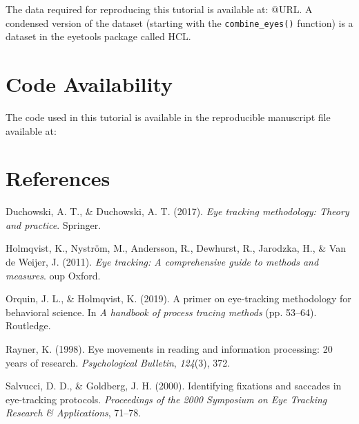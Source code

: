 \documentclass[
  man,
  floatsintext,
  longtable,
  nolmodern,
  notxfonts,
  notimes,
  colorlinks=true,linkcolor=blue,citecolor=blue,urlcolor=blue]{apa7}
\newlength{\cslhangindent}
\newenvironment{CSLReferences}[2] %
 {\begin{list}{}{%
  \setlength{\itemindent}{0pt}
  \setlength{\leftmargin}{0pt}
  \setlength{\parsep}{0pt}
  \ifodd #1
   \setlength{\leftmargin}{\cslhangindent}
   \setlength{\itemindent}{-1\cslhangindent}
  \fi
  \setlength{\itemsep}{#2\baselineskip}}}
 {\end{list}}
\begin{document}
The data required for reproducing this tutorial is available at: @URL. A
condensed version of the dataset (starting with the
\texttt{combine\_eyes()} function) is a dataset in the eyetools package
called HCL.

\section{Code Availability}\label{code-availability}

The code used in this tutorial is available in the reproducible
manuscript file available at:

\section{References}\label{references}

\label{refs}
\begin{CSLReferences}{1}{0}
Duchowski, A. T., \& Duchowski, A. T. (2017). \emph{Eye tracking
methodology: Theory and practice}. Springer.

Holmqvist, K., Nyström, M., Andersson, R., Dewhurst, R., Jarodzka, H.,
\& Van de Weijer, J. (2011). \emph{Eye tracking: A comprehensive guide
to methods and measures}. oup Oxford.

Orquin, J. L., \& Holmqvist, K. (2019). A primer on eye-tracking
methodology for behavioral science. In \emph{A handbook of process
tracing methods} (pp. 53--64). Routledge.

Rayner, K. (1998). Eye movements in reading and information processing:
20 years of research. \emph{Psychological Bulletin}, \emph{124}(3), 372.

Salvucci, D. D., \& Goldberg, J. H. (2000). Identifying fixations and
saccades in eye-tracking protocols. \emph{Proceedings of the 2000
Symposium on Eye Tracking Research \& Applications}, 71--78.

\end{CSLReferences}
\end{document}
